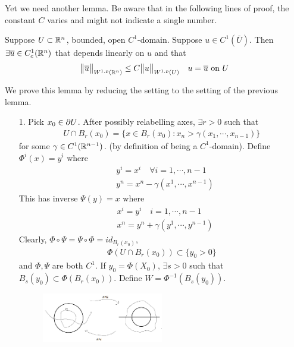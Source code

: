 \documentclass[12pt,a4paper]{report}
\newenvironment{proof}
{\begin{changemargin}{1cm}{0.5cm} 
	}%
	{\end{changemargin}
}
\begin{document}
Yet we need another lemma. Be aware that in the following lines of proof, the constant $C$ varies and might not indicate a single number.
\s

\lem Suppose $U\subset \mathbb{R}^n$, bounded, open $C^1$-domain. Suppose $u\in C^1 (\bar{U})$. Then $\exists \overline{u} \in C^1_c(\mathbb{R}^n)$ that depends linearly on $u$ and that
\begin{align*}
\bigl\lVert\overline{u}\bigr\rVert_{W^{1,p}(\mathbb{R}^n)} \leq C \bigl\lVert u\bigr\rVert_{W^{1,p}(U)} \quad u= \overline{u} \text{ on } U
\end{align*}
\begin{proof} 
\pf We prove this lemma by reducing the setting to the setting of the previous lemma.
\begin{itemize}
\item[1.] Pick $x_0 \in \partial U$. After possibly relabelling axes, $\exists r>0$ such that
\begin{align*}
U \cap B_r(x_0) = \{x\in B_r(x_0) : x_n > \gamma(x_1, \cdots, x_{n-1}) \}
\end{align*}
for some $\gamma \in C^1(\mathbb{R}^{n-1})$. (by definition of being a $C^1$-domain). Define $\Phi^i (x) = y^i$ where
\begin{align*}
& y^i  = x^i \quad \forall i=1, \cdots, n-1 \\
& y^n = x^n - \gamma(x^1, \cdots, x^{n-1})
\end{align*}
This has inverse $\Psi(y) = x$ where
\begin{align*}
& x^i = y^i \quad i=1,\cdots, n-1 \\
& x^n = y^n + \gamma(y^1, \cdots, y^{n-1})
\end{align*}
Clearly, $\Phi \circ \Psi = \Psi \circ \Phi = id_{B_r(x_0)}$,	
\begin{align*}
\Phi(U \cap B_r(x_0)) \subset \{y_0 >0 \}
\end{align*}
and $\Phi, \Psi$ are both $C^1$. If $y_0 = \Phi(X_0)$, $\exists s>0$ such that $B_s(y_0) \subset \Phi(B_r(x_0))$. Define $W = \Phi^{-1}(B_s(y_0))$.

\begin{figure}[h]
	\centering
	\includegraphics[width=0.5\textwidth]{5}
\end{figure}


\end{itemize}
\end{proof}
\end{document}
